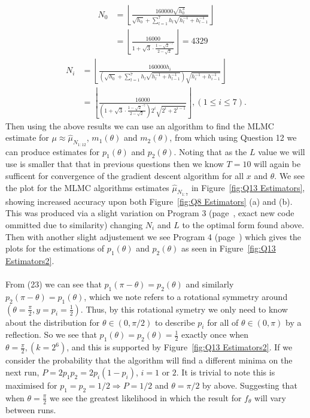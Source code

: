 \documentclass{article}
\begin{document}
\begin{equation*}
\begin{split}
{N_0} &= \left\lfloor \frac{160000 \sqrt{h_0^3}}{\sqrt{h_0} + \sum_{l=1}^{7} h_l \sqrt{h^{-1}_l + h^{-1}_{l-1}}} \right\rfloor \\
&= \left\lfloor \frac{16000}{1+ \sqrt{3} \cdot \frac{1-\sqrt{2}^{-7}}{2-\sqrt{2}}} \right\rfloor = 4329
\end{split}
\end{equation*}
\begin{equation*}
\begin{split}
{N_i} &= \left\lfloor \frac{160000 h_i}{ \left( \sqrt{h_0} + \sum_{l=1}^{7} h_l \sqrt{h^{-1}_l + h^{-1}_{l-1}} \right) \sqrt{h_i^{-1}+h_{i-1}^{-1}}} \right\rfloor \\
&=\left\lfloor \frac{16000}{(1+ \sqrt{3} \cdot \frac{1-\sqrt{2}^{-7}}{2-\sqrt{2}}) 2^i \sqrt{2^i+2^{i-1}}} \right\rfloor, (1 \leq i \leq 7).
\end{split}
\end{equation*}
Then using the above results we can use an algorithm to find the MLMC estimate for $\mu \approx \hat\mu_{N_{1:12}}$, $m_1(\theta)$ and $m_2(\theta)$, from which using Question 12 we can produce estimates for $p_1(\theta)$ and $p_2(\theta)$. Noting that as the $L$ value we will use is smaller that that in previous questions then we know $T=10$ will again be sufficent for convergence of the gradient descent algorithm for all $x$ and $\theta$. We see the plot for the MLMC algorithms estimates $\hat\mu_{N_{1:7}}$  in Figure~\ref{fig:Q13 Estimators}, showing increased accuracy upon both Figure~\ref{fig:Q8 Estimators} (a) and (b). This was produced via a slight variation on Program 3 (page~\pageref{subsec:Program 3}, exact new code ommitted due to similarity) changing $N_i$ and $L$ to the optimal form found above. Then with another slight adjustement we see Program 4 (page~\pageref{subsec:Program 4}) which gives the plots for the estimations of $p_1(\theta)$ and $p_2(\theta)$ as seen in Figure~\ref{fig:Q13 Estimators2}. \\
\\
From (23) we can see that $p_1(\pi-\theta)=p_2(\theta)$ and similarly $p_2(\pi-\theta)=p_1(\theta)$, which we note refers to a rotational symmetry around $(\theta =\frac{\pi}{2}, y=p_i=\frac{1}{2})$. Thus, by this rotational symetry we only need to know about the distribution for $\theta \in (0,\pi/2)$ to describe $p_i$ for all of $\theta \in (0,\pi)$ by a reflection. So we see that $p_1(\theta)=p_2(\theta)=\frac{1}{2}$ exactly once when $\theta = \frac{\pi}{2}, (k=2^6)$, and this is supported by Figure~\ref{fig:Q13 Estimators2}. If we consider the probability that the algorithm will find a different minima on the next run, $P=2p_1p_2=2p_i(1-p_i)$, $i=1$ or $2$. It is trivial to note this is maximised for $p_1=p_2=1/2 \Rightarrow P=1/2$ and $\theta = \pi/2$ by above. Suggesting that when $\theta=\frac{\pi}{2}$ we see the greatest likelihood in which the result for $f_\theta$ will vary between runs. \\
\end{document}
